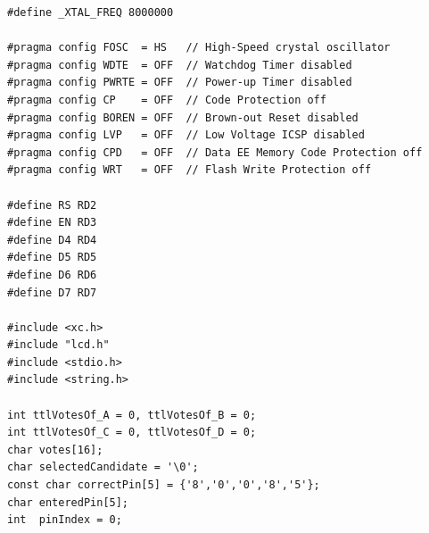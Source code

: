 \documentclass[11pt, a4paper]{report}
\begin{document}
\begin{lstlisting}[caption={Main source code for the digital voting system},
                   label={lst:main}]
#define _XTAL_FREQ 8000000

#pragma config FOSC  = HS   // High-Speed crystal oscillator
#pragma config WDTE  = OFF  // Watchdog Timer disabled
#pragma config PWRTE = OFF  // Power-up Timer disabled
#pragma config CP    = OFF  // Code Protection off
#pragma config BOREN = OFF  // Brown-out Reset disabled
#pragma config LVP   = OFF  // Low Voltage ICSP disabled
#pragma config CPD   = OFF  // Data EE Memory Code Protection off
#pragma config WRT   = OFF  // Flash Write Protection off

#define RS RD2
#define EN RD3
#define D4 RD4
#define D5 RD5
#define D6 RD6
#define D7 RD7

#include <xc.h>
#include "lcd.h"
#include <stdio.h>
#include <string.h>

int ttlVotesOf_A = 0, ttlVotesOf_B = 0;
int ttlVotesOf_C = 0, ttlVotesOf_D = 0;
char votes[16];
char selectedCandidate = '\0';
const char correctPin[5] = {'8','0','0','8','5'};
char enteredPin[5];
int  pinIndex = 0;


\end{lstlisting}
\end{document}
